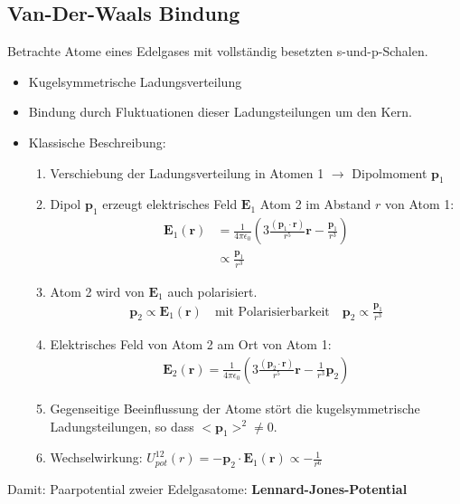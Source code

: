 \subsection{Van-Der-Waals Bindung}\label{kap:1_2}
	Betrachte Atome eines Edelgases mit vollständig besetzten s-und-p-Schalen.
	\begin{itemize}
		\item Kugelsymmetrische Ladungsverteilung
		\item Bindung durch Fluktuationen dieser Ladungsteilungen um den Kern.
		\item Klassische Beschreibung:
			\begin{enumerate}
				\item Verschiebung der Ladungsverteilung in Atomen 1 $\rightarrow$ Dipolmoment $\textbf{p}_1$
				\item Dipol $\textbf{p}_1$ erzeugt elektrisches Feld $\textbf{E}_1$\newline
						Atom 2 im Abstand $r$ von Atom 1:
						\begin{align}
							\textbf{E}_1(\textbf{r})&=\frac{1}{4\pi\epsilon_0}\left(3\frac{(\textbf{p}_1 \cdot \textbf{r})}{r^5}\textbf{r}-\frac{\textbf{p}_1}{r^3}\right) \\
							 &\propto \frac{\textbf{p}_1}{r^3}
						\end{align}
				\item Atom 2 wird von $\textbf{E}_1$ auch polarisiert.
						\begin{align}
							\textbf{p}_2 \propto \textbf{E}_1(\textbf{r}) \quad \text{mit Polarisierbarkeit} \quad
							\textbf{p}_2 \propto \frac{\textbf{p}_1}{r^3}
						\end{align}
				\item Elektrisches Feld von Atom 2 am Ort von Atom 1:
						\begin{align*}
							\textbf{E}_2(\textbf{r}) = \frac{1}{4\pi\epsilon_0}\left(3\frac{(\textbf{p}_2 \cdot \textbf{r})}{r^5}\textbf{r}-\frac{1}{r^3}\textbf{p}_2\right)
						\end{align*}
				\item Gegenseitige Beeinflussung der Atome stört die kugelsymmetrische Ladungsteilungen, so dass $<\textbf{p}_1>^2 \neq 0$.
				\item Wechselwirkung: $U_{pot}^{12}(r)= -\textbf{p}_2\cdot \textbf{E}_1(\textbf{r})\propto - \frac{1}{r^6}$
			\end{enumerate}
	\end{itemize}
	Damit: Paarpotential zweier Edelgasatome: \textbf{Lennard-Jones-Potential}
